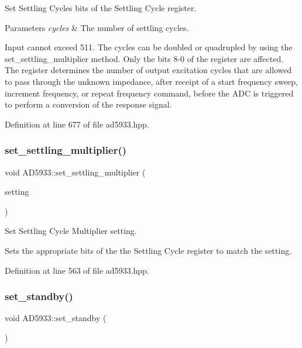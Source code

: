 Set Settling Cycles bits of the Settling Cycle register. 


\begin{DoxyParams}{Parameters}
{\em cycles} & The number of settling cycles.\\
\hline
\end{DoxyParams}
Input cannot exceed 511. The cycles can be doubled or quadrupled by using the set\+\_\+settling\+\_\+multiplier method. Only the bits 8-\/0 of the register are affected. The register determines the number of output excitation cycles that are allowed to pass through the unknown impedance, after receipt of a start frequency sweep, increment frequency, or repeat frequency command, before the A\+DC is triggered to perform a conversion of the response signal. 

Definition at line 677 of file ad5933.\+hpp.

\mbox{\label{struct_a_d5933_adf0b76ea665a956f1002c55360666f3d}} 
\subsubsection{\texorpdfstring{set\+\_\+settling\+\_\+multiplier()}{set\_settling\_multiplier()}}
{\footnotesize\ttfamily void A\+D5933\+::set\+\_\+settling\+\_\+multiplier (\begin{DoxyParamCaption}\item[{\mbox{\hyperlink{ad5933_8hpp_a0556cc9a11c997a97ffc50ecb94e59b8}{Settling\+Multiplier}}}]{setting }\end{DoxyParamCaption})}



Set Settling Cycle Multiplier setting. 

Sets the appropriate bits of the the Settling Cycle register to match the setting. 

Definition at line 563 of file ad5933.\+hpp.

\mbox{\label{struct_a_d5933_afb48b21e141f060170ea4065bf33f1f5}} 
\subsubsection{\texorpdfstring{set\+\_\+standby()}{set\_standby()}}
{\footnotesize\ttfamily void A\+D5933\+::set\+\_\+standby (\begin{DoxyParamCaption}{ }\end{DoxyParamCaption})}



